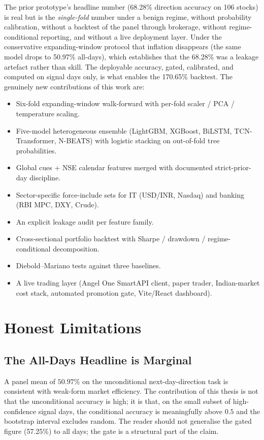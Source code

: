 The prior prototype's headline number (68.28\% direction accuracy on 106 stocks) is real but is the \emph{single-fold} number under a benign regime, without probability calibration, without a backtest of the panel through brokerage, without regime-conditional reporting, and without a live deployment layer. Under the conservative expanding-window protocol that inflation disappears (the same model drops to 50.97\% all-days), which establishes that the 68.28\% was a leakage artefact rather than skill. The deployable accuracy, gated, calibrated, and computed on signal days only, is what enables the 170.65\% backtest. The genuinely new contributions of this work are:

\begin{itemize}
    \item Six-fold expanding-window walk-forward with per-fold scaler / PCA / temperature scaling.
    \item Five-model heterogeneous ensemble (LightGBM, XGBoost, BiLSTM, TCN-Transformer, N-BEATS) with logistic stacking on out-of-fold tree probabilities.
    \item Global cues + NSE calendar features merged with documented strict-prior-day discipline.
    \item Sector-specific force-include sets for IT (USD/INR, Nasdaq) and banking (RBI MPC, DXY, Crude).
    \item An explicit leakage audit per feature family.
    \item Cross-sectional portfolio backtest with Sharpe / drawdown / regime-conditional decomposition.
    \item Diebold--Mariano tests against three baselines.
    \item A live trading layer (Angel One SmartAPI client, paper trader, Indian-market cost stack, automated promotion gate, Vite/React dashboard).
\end{itemize}

\section{Honest Limitations}

\subsection{The All-Days Headline is Marginal}

A panel mean of $50.97\%$ on the unconditional next-day-direction task is consistent with weak-form market efficiency. The contribution of this thesis is not that the unconditional accuracy is high; it is that, on the small subset of high-confidence signal days, the conditional accuracy is meaningfully above $0.5$ and the bootstrap interval excludes random. The reader should not generalise the gated figure (57.25\%) to all days; the gate is a structural part of the claim.


